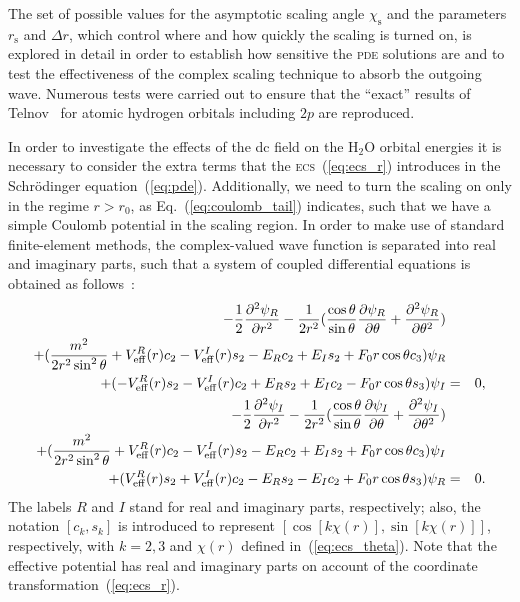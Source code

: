 The set of possible values for the asymptotic scaling angle
$\chi_{\mathrm{s}}$ and the parameters $r_{\mathrm{s}}$ and $\Delta
r$, which control where and how quickly the scaling is turned on, is
explored in detail in order to establish how sensitive the
\textsc{pde} solutions are and to test the effectiveness of the
complex scaling technique to absorb the outgoing wave. Numerous tests
were carried out to ensure that the ``exact'' results of
Telnov~\cite{Telnov_1989} for atomic hydrogen orbitals including $2p$
are reproduced.

In order to investigate the effects of the dc field on the H$_{2}$O
orbital energies it is necessary to consider the extra terms that the
\textsc{ecs}~(\ref{eq:ecs_r}) introduces in the Schr\"{o}dinger
equation~(\ref{eq:pde}). Additionally, we need to turn the scaling on
only in the regime $r > r_{0}$, as Eq.~(\ref{eq:coulomb_tail})
indicates, such that we have a simple Coulomb potential in the scaling
region. In order to make use of standard finite-element methods, the
complex-valued wave function is separated into real and imaginary
parts, such that a system of coupled differential equations is
obtained as follows~\cite{sarias_2016}:
%
\begin{eqnarray}
  -\frac{1}{2}\frac{\partial^{2}\psi_{R}}{\partial r^2}-\frac{1}{2r^2}
  (\frac{\cos\theta}{\sin\theta}\frac{\partial\psi_{R}}{\partial\theta}+
  \frac{\partial^{2}\psi_{R}}{\partial\theta^2}) \nonumber\\
  +(\frac{m^2}{2r^2\sin^2\theta}+V_{\rm{eff}}^{R}(r)c_{2}-V_{\rm{eff}}^{I}(r)s_{2}
  -E_{R}c_{2}+E_{I}s_{2}+
  F_{0}r\cos\theta c_{3})\psi_{R} \nonumber\\
  +(-V_{\rm{eff}}^{R}(r)s_{2}-V_{\rm{eff}}^{I}(r)c_{2}+E_{R}s_{2}+E_{I}c_{2}-F_{0}r\cos\theta
  s_{3})\psi_{I} & = & 0, \nonumber\\
  \vspace{1cm}
  -\frac{1}{2}\frac{\partial^{2}\psi_{I}}{\partial r^2}-\frac{1}{2r^2}
  (\frac{\cos\theta}{\sin\theta}\frac{\partial\psi_{I}}{\partial\theta}+
  \frac{\partial^{2}\psi_{I}}{\partial\theta^2}) \nonumber\\
  +(\frac{m^2}{2r^2\sin^2\theta}+V_{\rm{eff}}^{R}(r)c_{2}-V_{\rm{eff}}^{I}(r)s_{2}
  -E_{R}c_{2}+E_{I}s_{2}+
  F_{0}r\cos\theta c_{3})\psi_{I} \nonumber\\
  +(V_{\rm{eff}}^{R}(r)s_{2}+V_{\rm{eff}}^{I}(r)c_{2}-E_{R}s_{2}-E_{I}c_{2}+F_{0}r\cos\theta
  s_{3})\psi_{R} & = & 0.
\label{eq:pde_system}
\end{eqnarray}
%
The labels $R$ and $I$ stand for real and imaginary parts,
respectively; also, the notation $[c_{k},s_{k}]$ is introduced to
represent $[\cos[k\chi(r)], \sin[k\chi(r)]]$, respectively, with
$k=2,3$ and $\chi(r)$ defined in~(\ref{eq:ecs_theta}). Note that the
effective potential has real and imaginary parts on account of the
coordinate transformation~(\ref{eq:ecs_r}).
 
